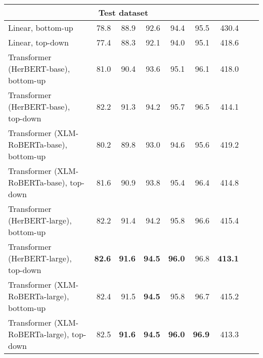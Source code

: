 \begin{table}[ht!]
{\begin{tabular}{lrrrrrrrr}
   \hline \multicolumn{7}{c}{\textbf{Test dataset}} \\ \hline
Linear, bottom-up & 78.8 & 88.9 & 92.6 & 94.4 & 95.5 & 430.4 \\ 
  Linear, top-down & 77.4 & 88.3 & 92.1 & 94.0 & 95.1 & 418.6 \\ 
  Transformer (HerBERT-base), bottom-up & 81.0 & 90.4 & 93.6 & 95.1 & 96.1 & 418.0 \\ 
  Transformer (HerBERT-base), top-down & 82.2 & 91.3 & 94.2 & 95.7 & 96.5 & 414.1 \\ 
  Transformer (XLM-RoBERTa-base), bottom-up & 80.2 & 89.8 & 93.0 & 94.6 & 95.6 & 419.2 \\ 
  Transformer (XLM-RoBERTa-base), top-down & 81.6 & 90.9 & 93.8 & 95.4 & 96.4 & 414.8 \\ 
  Transformer (HerBERT-large), bottom-up & 82.2 & 91.4 & 94.2 & 95.8 & 96.6 & 415.4 \\ 
  Transformer (HerBERT-large), top-down & \textbf{82.6} & \textbf{91.6} & \textbf{94.5} & \textbf{96.0} & 96.8 & \textbf{413.1} \\ 
  Transformer (XLM-RoBERTa-large), bottom-up & 82.4 & 91.5 & \textbf{94.5} & 95.8 & 96.7 & 415.2 \\ 
  Transformer (XLM-RoBERTa-large), top-down & 82.5 & \textbf{91.6} & \textbf{94.5} & \textbf{96.0} & \textbf{96.9} & 413.3 \\ 
   \hline
\end{tabular}
}
\end{table}




